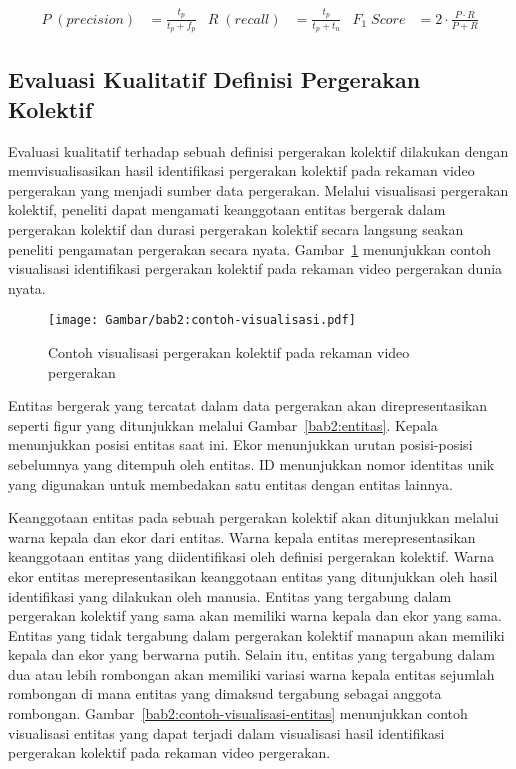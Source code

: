 \begin{align*}
    P\;(precision) & = \frac{t_p}{t_p + f_p} & R\;(recall) & = \frac{t_p}{t_p + t_n} & F_1\;Score & = 2 \cdot \frac{P \cdot R}{P + R}
\end{align*}

\subsection{Evaluasi Kualitatif Definisi Pergerakan Kolektif}
\label{subsec:qualitative-theory}

Evaluasi kualitatif terhadap sebuah definisi pergerakan kolektif dilakukan dengan memvisualisasikan hasil identifikasi pergerakan kolektif pada rekaman video pergerakan yang menjadi sumber data pergerakan. Melalui visualisasi pergerakan kolektif, peneliti dapat mengamati keanggotaan entitas bergerak dalam pergerakan kolektif dan durasi pergerakan kolektif secara langsung seakan peneliti pengamatan pergerakan secara nyata. Gambar~\ref{bab2:visualization} menunjukkan contoh visualisasi identifikasi pergerakan kolektif pada rekaman video pergerakan dunia nyata.

\begin{figure}[h]
    \centering
    \texttt{[image: Gambar/bab2:contoh-visualisasi.pdf]}
    \caption[Contoh visualisasi pergerakan kolektif]{Contoh visualisasi pergerakan kolektif pada rekaman video pergerakan}
    \label{bab2:visualization}
\end{figure}

Entitas bergerak yang tercatat dalam data pergerakan akan direpresentasikan seperti figur yang ditunjukkan melalui Gambar~\ref{bab2:entitas}. Kepala menunjukkan posisi entitas saat ini. Ekor menunjukkan urutan posisi-posisi sebelumnya yang ditempuh oleh entitas. ID menunjukkan nomor identitas unik yang digunakan untuk membedakan satu entitas dengan entitas lainnya.

\clearpage

Keanggotaan entitas pada sebuah pergerakan kolektif akan ditunjukkan melalui warna kepala dan ekor dari entitas. Warna kepala entitas merepresentasikan keanggotaan entitas yang diidentifikasi oleh definisi pergerakan kolektif. Warna ekor entitas merepresentasikan keanggotaan entitas yang ditunjukkan oleh hasil identifikasi yang dilakukan oleh manusia. Entitas yang tergabung dalam pergerakan kolektif yang sama akan memiliki warna kepala dan ekor yang sama. Entitas yang tidak tergabung dalam pergerakan kolektif manapun akan memiliki kepala dan ekor yang berwarna putih. Selain itu, entitas yang tergabung dalam dua atau lebih rombongan akan memiliki variasi warna kepala entitas sejumlah rombongan di mana entitas yang dimaksud tergabung sebagai anggota rombongan. Gambar~\ref{bab2:contoh-visualisasi-entitas} menunjukkan contoh visualisasi entitas yang dapat terjadi dalam visualisasi hasil identifikasi pergerakan kolektif pada rekaman video pergerakan.

